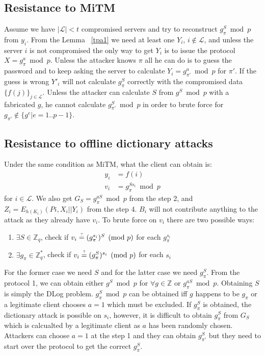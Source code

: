 \subsection{Resistance to MiTM}
Assume we have $|\mathcal{L}| < t$ compromised servers and try to
reconstruct $g_{\pi}^S \bmod p$ from ${y_i}$. From the Lemma
~\ref{tpa1} we need at least one $Y_i$, $i \notin \mathcal{L}$, and
unless the server $i$ is not compromised the only way to get $Y_i$ is
to issue the protocol $X = g_{\pi}^a \bmod p$. Unless the attacker
knows $\pi$ all he can do is to guess the password and to keep asking
the server to calculate $Y_i = g_{\pi'}^a \bmod p$ for $\pi'$. If the
guess is wrong $Y'_i$ will not calculate $g_{\pi}^S$ correctly with
the compromised data $\{f(j)\}_{j \in \mathcal{L}}$.
Unless the attacker can calculate $S$ from $g^S \bmod p$ with a
fabricated $g$, he cannot calculate $g_{\pi'}^S \bmod p$ in
order to brute force for $g_{\pi'} \notin \{g^e | e = 1..p-1\}$.

\subsection{Resistance to offline dictionary attacks}
Under the same condition as MiTM, what the client can obtain is:
\begin{align*}
  y_i &= f(i) \\
  v_i &= g_{\pi}^{Ss_i} \bmod p
\end{align*}
for $i \in \mathcal{L}$. We also get $G_S = g_{\pi}^{aS} \bmod p$ from
the step 2, and $Z_i = E_{h(K_i)}(Pi, X_i||Y_i)$ from the step
4. $B_i$ will not contribute anything to the attack as they already
have $v_i$.
To brute force on $v_i$ there are two possible ways:
\begin{enumerate}
\item $\exists S \in \mathbb{Z}_q$, check if
  $v_i \stackrel{\text{\tiny ?}}{=} (g_{\pi}^{s_i})^S \pmod p$
  for each $g_{\pi}^{s_i}$ \\
\item $\exists g_{\pi} \in \mathbb{Z}^*_q$, check if
  $v_i \stackrel{\text{\tiny ?}}{=} (g_{\pi}^S)^{s_i} \pmod p$
  for each $s_i$
\end{enumerate}
For the former case we need $S$ and for the latter case we need
$g_{\pi}^S$. From the protocol 1, we can obtain either $g^S \bmod p$
for $\forall g \in \mathbb{Z}$ or $g_{\pi}^{aS} \bmod p$. Obtaining
$S$ is simply the {\sf DLog} problem. $g_{\pi}^S \bmod p$ can be
obtained iff $g$ happens to be $g_{\pi}$ or a legitimate client
chooses $a = 1$ which must be excluded.
If $g_{\pi}^S$ is obtained, the dictionary attack is possible on
$s_i$, however, it is difficult to obtain $g_{\pi}^S$ from $G_S$ which
is calcualted by a legitimate client as $a$ has been randomly
chosen. Attackers can choose $a = 1$ at the step 1 and they can obtain
$g_{\pi'}^S$ but they need to start over the protocol to get the
correct $g_{\pi}^S$.
